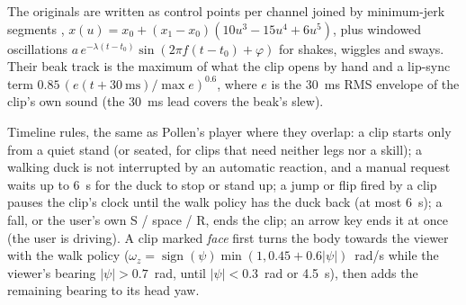 \documentclass[11pt]{article}
\begin{document}
The originals are written as control points per channel joined by minimum-jerk segments \cite{minjerk},
$x(u) = x_0 + (x_1-x_0)(10u^3-15u^4+6u^5)$, plus windowed oscillations
$a\,e^{-\lambda (t-t_0)}\sin(2\pi f (t-t_0)+\varphi)$ for shakes, wiggles and sways. Their beak track is the
maximum of what the clip opens by hand and a lip-sync term $0.85\,(e(t+30~\text{ms})/\max e)^{0.6}$, where $e$ is
the 30~ms RMS envelope of the clip's own sound (the 30~ms lead covers the beak's slew).

Timeline rules, the same as Pollen's player where they overlap: a clip starts only from a quiet stand (or seated,
for clips that need neither legs nor a skill); a walking duck is not interrupted by an automatic reaction, and a
manual request waits up to 6~s for the duck to stop or stand up; a jump or flip fired by a clip pauses the clip's
clock until the walk policy has the duck back (at most 6~s); a fall, or the user's own S / space / R, ends the
clip; an arrow key ends it at once (the user is driving). A clip marked \emph{face} first turns the body towards
the viewer with the walk policy ($\omega_z=\operatorname{sign}(\psi)\min(1, 0.45+0.6|\psi|)$~rad/s while the
viewer's bearing $|\psi|>0.7$~rad, until $|\psi|<0.3$~rad or 4.5~s), then adds the remaining bearing to its head
yaw.
\end{document}
